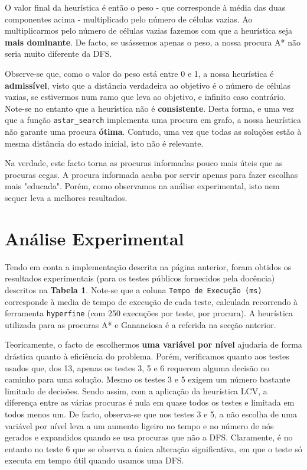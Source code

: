 \documentclass[12pt,a4paper]{article}
\begin{document}
O valor final da heurística é então o peso - que corresponde à média das duas componentes acima - multiplicado pelo número de células vazias.
Ao multiplicarmos pelo número de células vazias fazemos com que a heurística seja \textbf{mais dominante}.
De facto, se usássemos apenas o peso, a nossa procura A* não seria muito diferente da DFS.

Observe-se que, como o valor do peso está entre 0 e 1, a nossa heurística é \textbf{admissível}, visto que a distância verdadeira ao objetivo é o número de células vazias, se estivermos num ramo que leva ao objetivo, e infinito caso contrário.
Note-se no entanto que a heurística não é \textbf{consistente}.
Desta forma, e uma vez que a função \texttt{astar\_search} implementa uma procura em grafo, a nossa heurística não garante uma procura \textbf{ótima}.
Contudo, uma vez que todas as soluções estão à mesma distância do estado inicial, isto não é relevante.

Na verdade, este facto torna as procuras informadas pouco mais úteis que as procuras cegas.
A procura informada acaba por servir apenas para fazer escolhas mais "educada".
Porém, como observamos na análise experimental, isto nem sequer leva a melhores resultados.

\section*{Análise Experimental}

Tendo em conta a implementação descrita na página anterior, foram obtidos os resultados experimentais (para os testes públicos fornecidos pela docência) descritos na \textbf{Tabela 1}.
 Note-se que a coluna \texttt{Tempo de Execução (ms)} corresponde à media de tempo de execução de cada teste, calculada recorrendo à ferramenta \texttt{hyperfine} (com 250 execuções por teste, por procura).
 A heurística utilizada para as procuras A* e Gananciosa é a referida na secção anterior.

Teoricamente, o facto de escolhermos \textbf{uma variável por nível} ajudaria de forma drástica quanto à eficiência do problema.
Porém, verificamos quanto aos testes usados que, dos 13, apenas os testes 3, 5 e 6 requerem alguma decisão no caminho para uma solução.
Mesmo os testes 3 e 5 exigem um número bastante limitado de decisões.
Sendo assim, com a aplicação da heurística LCV, a diferença entre as várias procuras é nula em quase todos os testes e limitada em todos menos um.
De facto, observa-se que nos testes 3 e 5, a não escolha de uma variável por nível leva a um aumento ligeiro no tempo e no número de nós gerados e expandidos quando se usa procuras que não a DFS.
Claramente, é no entanto no teste 6 que se observa a única alteração significativa, em que o teste só executa em tempo útil quando usamos uma DFS.
\end{document}
